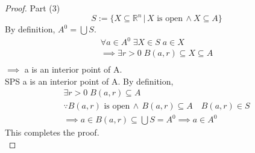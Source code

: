 \documentclass[11pt, oneside]{book}
\theoremstyle{break}
\newtheorem*{proof}{Proof}
\newcommand{\bb}[1]{\mathbb{#1}}			%
\begin{document}
\begin{proof}
	Part (3) \\
	\begin{equation*}
		S := \{ X \subseteq \bb{R}^n \, | \, X \text{ is open} \, \land X \subseteq A \}
	\end{equation*}
	By definition, $A^0 = \bigcup S$.
	\begin{gather*}
		\forall a \in A^0 \; \exists X \in S \; a \in X \\
		\implies \exists r > 0 \; B(a, r) \subseteq X \subseteq A \\
	\end{gather*}
	$\implies$ a is an interior point of A. \\
	SPS a is an interior point of A. By definition,
	\begin{gather*}
		\exists r > 0 \; B(a, r) \subseteq A \\
		\because B(a, r) \text{ is open} \, \land \, B(a, r) \subseteq A \quad B(a, r) \in S \\
		\implies a \in B(a, r) \subseteq \bigcup S = A^0 \implies a \in A^0
	\end{gather*}
	This completes the proof. \\


\end{proof}
\end{document}

